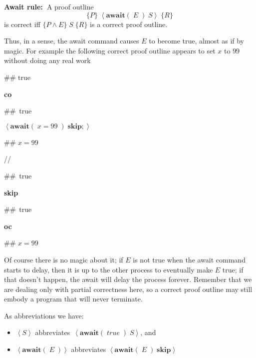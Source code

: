 \documentclass[muchmore,11pt]{article}%
\begin{document}
\textbf{Await rule:\ }A proof outline%
\[
\{P\}\;\left\langle \mathbf{await}(\;E\;)\;S\right\rangle \;\{R\}
\]
is correct iff $\{P\wedge E\}\;S\;\{R\}$ is a correct proof outline.

Thus, in a sense, the await command causes $E$ to become true, almost as if by
magic. For example the following correct proof outline appears to set $x$ to
$99$ without doing any real work

\begin{code}
\#\# true

\textbf{co}

\begin{indent}
\item \#\#\ true

\item $\left\langle \mathbf{await}(\;x=99\;)\;\mathbf{skip};\right\rangle $

\item \#\# $x=99$
\end{indent}

//

\begin{indent}
\item \#\#\ true

\item \textbf{skip}

\item \#\#\ true
\end{indent}

\textbf{oc}

\#\# $x=99$
\end{code}

\noindent Of course there is no magic about it; if $E$ is not true when the
await command starts to delay, then it is up to the other process to
eventually make $E$ true; if that doesn't happen, the await will delay the
process forever. Remember that we are dealing only with partial correctness
here, so a correct proof outline may still embody a program that will never terminate.

As abbreviations we have:

\begin{itemize}
\item $\left\langle S\right\rangle $ abbreviates $\,\left\langle
\mathbf{await}(\;\mathit{true}\;)\;S\right\rangle $, and

\item $\left\langle \mathbf{await}(\;E\;)\right\rangle $ abbreviates
$\left\langle \mathbf{await}(\;E\;)\;\mathbf{skip}\right\rangle $
\end{itemize}
\end{document}
